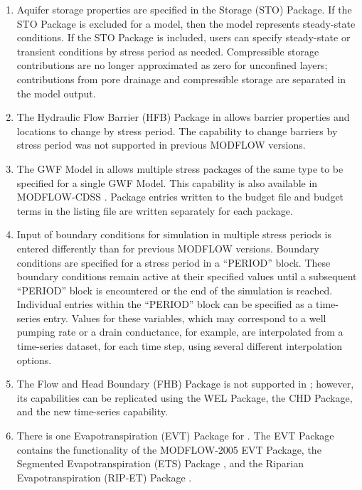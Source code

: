\begin{enumerate}
\item Aquifer storage properties are specified in the Storage (STO) Package.  If the STO Package is excluded for a model, then the model represents steady-state conditions.  If the STO Package is included, users can specify steady-state or transient conditions by stress period as needed.  Compressible storage contributions are no longer approximated as zero for unconfined layers; contributions from pore drainage and compressible storage are separated in the model output.

\item The Hydraulic Flow Barrier (HFB) Package \citep{hsieh1993hfb, modflow2005} in \mf allows barrier properties and locations to change by stress period.  The capability to change barriers by stress period was not supported in previous MODFLOW versions.

\item The GWF Model in \mf allows multiple stress packages of the same type to be specified for a single GWF Model.  This capability is also available in MODFLOW-CDSS \citep{banta2011modflow}.  Package entries written to the budget file and budget terms in the listing file are written separately for each package.

\item Input of boundary conditions for simulation in multiple stress periods is entered differently than for previous MODFLOW versions. Boundary conditions are specified for a stress period in a ``PERIOD'' block. These boundary conditions remain active at their specified values until a subsequent ``PERIOD'' block is encountered or the end of the simulation is reached.  Individual entries within the ``PERIOD'' block can be specified as a time-series entry.  Values for these variables, which may correspond to a well pumping rate or a drain conductance, for example, are interpolated from a time-series dataset, for each time step, using several different interpolation options.

\item The Flow and Head Boundary (FHB) Package \citep{leake1997documentation, modflow2005} is not supported in \mf; however, its capabilities can be replicated using the WEL Package, the CHD Package, and the new time-series capability.

\item There is one Evapotranspiration (EVT) Package for \mf. The \mf EVT Package contains the functionality of the MODFLOW-2005 EVT Package, the Segmented Evapotranspiration (ETS) Package \citep{modflowdrtpack}, and the Riparian Evapotranspiration (RIP-ET) Package \citep{modflowripetpack}.


\end{enumerate}
